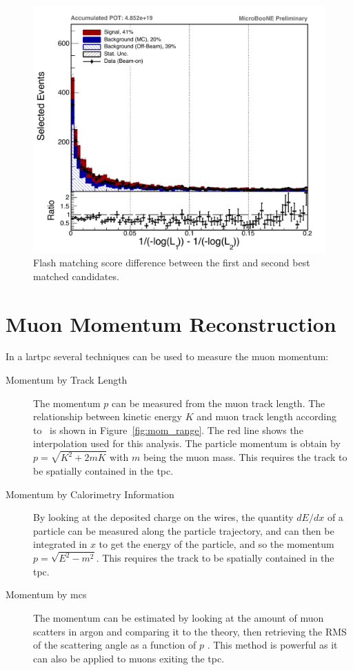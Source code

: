 \begin{figure}[]
\centering
\includegraphics[width=.65\textwidth]{images/FlashMatching/delta_score}
\caption[Flash Matching Score Difference]{Flash matching score difference between the first and second best matched candidates.}
\label{fig:delta_score}
\end{figure}










\section{Muon Momentum Reconstruction}
\label{sec:momentum_reco}

In a \acrshort{lartpc} several techniques can be used to measure the muon momentum:
\begin{description}
\item[Momentum by Track Length] The momentum $p$ can be measured from the muon track length. The relationship between kinetic energy $K$ and muon track length according to~\cite{pdg_muon_mom} is shown in Figure~\ref{fig:mom_range}. The red line shows the interpolation used for this analysis. The particle momentum is obtain by $p = \sqrt{K^2 + 2  m  K}$ with $m$ being the muon mass. This requires the track to be spatially contained in the \acrshort{tpc}.
\item[Momentum by Calorimetry Information] By looking at the deposited charge on the wires, the quantity $dE/dx$ of a particle can be measured along the particle trajectory, and can then be integrated in $x$ to get the energy of the particle, and so the momentum $p = \sqrt{E^2 - m^2}$. This requires the track to be spatially contained in the \acrshort{tpc}.
\item[Momentum by \acrlong{mcs}] The momentum can be estimated by looking at the amount of muon scatters in argon and comparing it to the theory, then retrieving the RMS of the scattering angle as a function of $p$ \cite{mcs}. This method is powerful as it can also be applied to muons exiting the \acrshort{tpc}.
\end{description}

